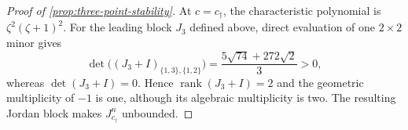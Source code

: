 \documentclass[letterpaper,twoside]{article}
\begin{document}
\begin{proof}[Proof of \cref{prop:three-point-stability}]
At $c=c_\dagger$, the characteristic polynomial is
$\zeta^2(\zeta+1)^2$.  For the leading block $J_3$ defined above, direct
evaluation of one $2\times2$ minor gives
\[
 \det\!\bigl((J_3+I)_{\{1,3\},\{1,2\}}\bigr)
 =\frac{5\sqrt{74}+272\sqrt2}{3}>0,
\]
whereas $\det(J_3+I)=0$.  Hence $\operatorname{rank}(J_3+I)=2$ and the
geometric multiplicity of $-1$ is one, although its algebraic multiplicity
is two.  The resulting Jordan block makes $J_{c_\dagger}^n$ unbounded.
\end{proof}


\clearpage



\clearpage

\end{document}
